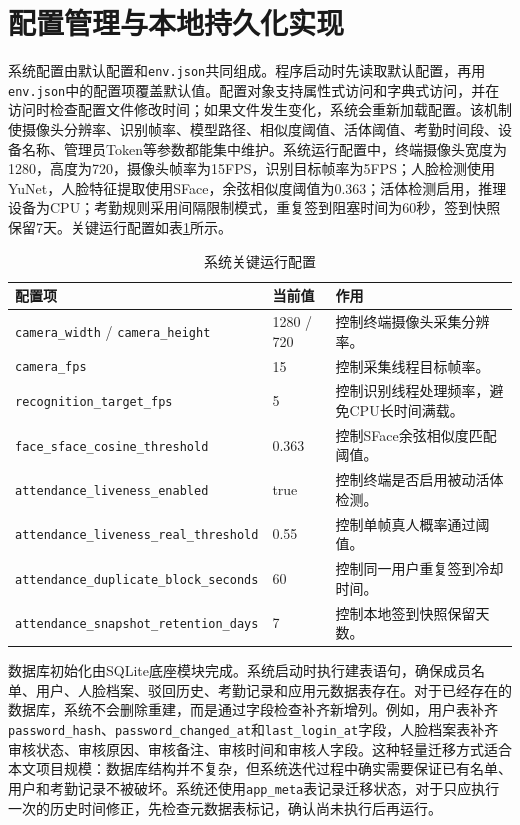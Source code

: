 \section{配置管理与本地持久化实现}

系统配置由默认配置和\texttt{env.json}共同组成。程序启动时先读取默认配置，再用\texttt{env.json}中的配置项覆盖默认值。配置对象支持属性式访问和字典式访问，并在访问时检查配置文件修改时间；如果文件发生变化，系统会重新加载配置。该机制使摄像头分辨率、识别帧率、模型路径、相似度阈值、活体阈值、考勤时间段、设备名称、管理员Token等参数都能集中维护。系统运行配置中，终端摄像头宽度为1280，高度为720，摄像头帧率为15FPS，识别目标帧率为5FPS；人脸检测使用YuNet，人脸特征提取使用SFace，余弦相似度阈值为0.363；活体检测启用，推理设备为CPU；考勤规则采用间隔限制模式，重复签到阻塞时间为60秒，签到快照保留7天。关键运行配置如表\ref{tab:runtime_config}所示。

\begin{table}[H]
    \centering
    \caption{系统关键运行配置}
    \label{tab:runtime_config}
    \begin{tabularx}{\textwidth}{p{4cm}p{3cm}X}
        \toprule
        \textbf{配置项} & \textbf{当前值} & \textbf{作用} \\
        \midrule
        \texttt{camera\_width} / \texttt{camera\_height} & 1280 / 720 & 控制终端摄像头采集分辨率。 \\
        \texttt{camera\_fps} & 15 & 控制采集线程目标帧率。 \\
        \texttt{recognition\_target\_fps} & 5 & 控制识别线程处理频率，避免CPU长时间满载。 \\
        \texttt{face\_sface\_cosine\_threshold} & 0.363 & 控制SFace余弦相似度匹配阈值。 \\
        \texttt{attendance\_liveness\_enabled} & true & 控制终端是否启用被动活体检测。 \\
        \texttt{attendance\_liveness\_real\_threshold} & 0.55 & 控制单帧真人概率通过阈值。 \\
        \texttt{attendance\_duplicate\_block\_seconds} & 60 & 控制同一用户重复签到冷却时间。 \\
        \texttt{attendance\_snapshot\_retention\_days} & 7 & 控制本地签到快照保留天数。 \\
        \bottomrule
    \end{tabularx}
\end{table}

数据库初始化由SQLite底座模块完成。系统启动时执行建表语句，确保成员名单、用户、人脸档案、驳回历史、考勤记录和应用元数据表存在。对于已经存在的数据库，系统不会删除重建，而是通过字段检查补齐新增列。例如，用户表补齐\texttt{password\_hash}、\texttt{password\_changed\_at}和\texttt{last\_login\_at}字段，人脸档案表补齐审核状态、审核原因、审核备注、审核时间和审核人字段。这种轻量迁移方式适合本文项目规模：数据库结构并不复杂，但系统迭代过程中确实需要保证已有名单、用户和考勤记录不被破坏。系统还使用\texttt{app\_meta}表记录迁移状态，对于只应执行一次的历史时间修正，先检查元数据表标记，确认尚未执行后再运行。

